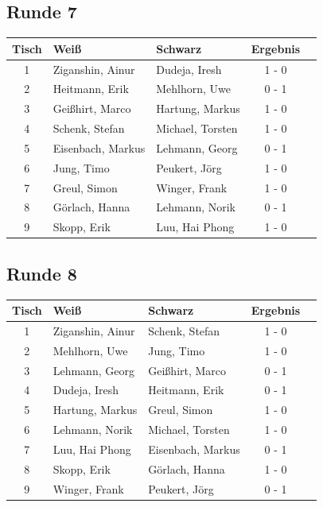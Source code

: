 \documentclass[a4paper,ngerman]{tui-algo-seminar}
\begin{document}
\subsection{Runde 7}
\begin{center}
\begin{tabular}{cllcl}
\toprule
\textbf{Tisch} & \textbf{Weiß} & \textbf{Schwarz} & \textbf{Ergebnis} \\
\midrule
1 & Ziganshin, Ainur & Dudeja, Iresh & 1 - 0 \\
2 & Heitmann, Erik & Mehlhorn, Uwe & 0 - 1 \\
3 & Geißhirt, Marco & Hartung, Markus & 1 - 0 \\
4 & Schenk, Stefan & Michael, Torsten & 1 - 0 \\
5 & Eisenbach, Markus & Lehmann, Georg & 0 - 1 \\
6 & Jung, Timo & Peukert, Jörg & 1 - 0 \\
7 & Greul, Simon & Winger, Frank & 1 - 0 \\
8 & Görlach, Hanna & Lehmann, Norik & 0 - 1 \\
9 & Skopp, Erik & Luu, Hai Phong & 1 - 0 \\
\bottomrule
\end{tabular}
\end{center}
\clearpage

\subsection{Runde 8}
\begin{center}
\begin{tabular}{cllcl}
\toprule
\textbf{Tisch} & \textbf{Weiß} & \textbf{Schwarz} & \textbf{Ergebnis} \\
\midrule
1 & Ziganshin, Ainur & Schenk, Stefan & 1 - 0 \\
2 & Mehlhorn, Uwe & Jung, Timo & 1 - 0 \\
3 & Lehmann, Georg & Geißhirt, Marco & 0 - 1 \\
4 & Dudeja, Iresh & Heitmann, Erik & 0 - 1 \\
5 & Hartung, Markus & Greul, Simon & 1 - 0 \\
6 & Lehmann, Norik & Michael, Torsten & 1 - 0 \\
7 & Luu, Hai Phong & Eisenbach, Markus & 0 - 1 \\
8 & Skopp, Erik & Görlach, Hanna & 1 - 0 \\
9 & Winger, Frank & Peukert, Jörg & 0 - 1 \\
\bottomrule
\end{tabular}
\end{center}
\end{document}
